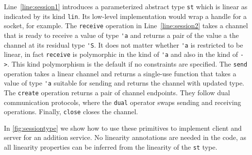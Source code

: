 Line~\ref{line:session1} introduces a parameterized abstract
type \lstinline{st} which is linear as indicated
by its kind \lstinline{lin}. Its low-level implementation would wrap a
handle for a socket, for example. The \lstinline{receive}  operation
in Line~\ref{line:session2} takes a channel that is ready to receive a
value of type \lstinline{'a} and returns a pair of the value a the
channel at its residual type \lstinline{'S}. It does not matter
whether \lstinline{'a} is restricted to be linear, in fact
\lstinline{receive} is polymorphic in the kind of \lstinline{'a} and
also in the kind of \lstinline{->}. This kind polymorphism is the
default if no constraints are specified.
%
The \lstinline{send} operation takes a linear channel and returns a
single-use function that takes a value of type \lstinline{'a} suitable
for sending and returns the channel with updated type.
%
The \lstinline{create} operation returns a pair of channel
endpoints. They follow dual communication protocols, where the
\lstinline{dual} operator swaps sending and receiving operations.
%
Finally, \lstinline{close} closes the channel.

In \cref{fig:sessiontype} we show how to use these primitives to
implement client and server for an addition service.
No linearity annotations are needed in the code, as all linearity
properties can be inferred from the linearity of the \texttt{st} type.

